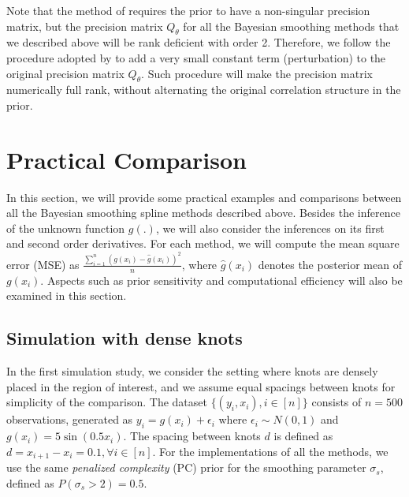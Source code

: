 \documentclass{article}
\begin{document}
Note that the method of \cite{tierney1986accurate} requires the prior to have a non-singular precision matrix, but the precision matrix $Q_\theta$ for all the Bayesian smoothing methods that we described above will be rank deficient with order 2. Therefore, we follow the procedure adopted by \cite{wood2011fast} to add a very small constant term (perturbation) to the original precision matrix $Q_\theta$. Such procedure will make the precision matrix numerically full rank, without alternating the original correlation structure in the prior.

\section{Practical Comparison}\label{practice}

In this section, we will provide some practical examples and comparisons between all the Bayesian smoothing spline methods described above. Besides the inference of the unknown function $g(.)$, we will also consider the inferences on its first and second order derivatives. For each method, we will compute the mean square error (MSE) as $\frac{\sum_{i=1}^n (g(x_i) - \hat{g}(x_i))^2}{n}$, where $\hat{g}(x_i)$ denotes the posterior mean of $g(x_i)$. Aspects such as prior sensitivity and computational efficiency will also be  examined in this section.

\subsection{Simulation with dense knots}

In the first simulation study, we consider the setting where knots are densely placed in the region of interest, and we assume equal spacings between knots for simplicity of the comparison. The dataset $\{(y_i,x_i), i \in [n]\}$ consists of $n = 500$ observations, generated as $y_i = g(x_i) + \epsilon_i$ where $\epsilon_i \sim N(0,1)$ and $g(x_i) = 5 \sin (0.5 x_i)$. The spacing between knots $d$ is defined as $d = x_{i+1} - x_i = 0.1, \forall i \in [n]$. For the implementations of all the methods, we use the same \textit{penalized complexity} (PC) prior \citep{simpson2017penalising} for the smoothing parameter $\sigma_s$, defined as $P(\sigma_s > 2) = 0.5$. 
\end{document}
